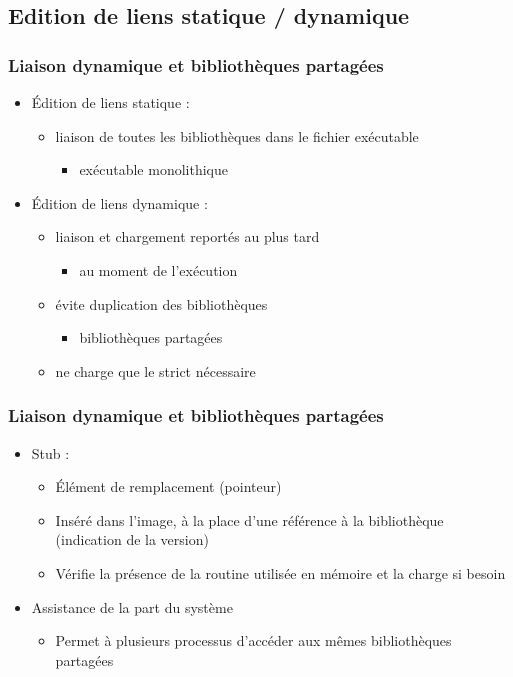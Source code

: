\subsection{Edition de liens statique / dynamique}

\begin{frame}
\frametitle{Liaison dynamique et bibliothèques partagées}
\begin{itemize}
\item Édition de liens statique : 
\begin{itemize}
\item liaison de toutes les bibliothèques dans le fichier exécutable 
\begin{itemize}
\item exécutable monolithique
\end{itemize}

\end{itemize}
\item <2->Édition de liens dynamique :
\begin{itemize}
\item liaison et chargement reportés au plus tard
\begin{itemize}
\item au moment de l'exécution
\end{itemize}
\item évite duplication des bibliothèques
\begin{itemize}
\item bibliothèques partagées
\end{itemize}
\item ne charge que le strict nécessaire
\end{itemize}
\end{itemize}
\end{frame}


\begin{frame}
\frametitle{Liaison dynamique et bibliothèques partagées}
\begin{itemize}
\item Stub :
\begin{itemize}
\item Élément de remplacement (pointeur)
\item Inséré dans l'image, à la place d'une référence à la bibliothèque (indication de la version)
\item Vérifie la présence de la routine utilisée en mémoire et la charge si besoin
\end{itemize}
\item Assistance de la part du système
\begin{itemize}
\item Permet à plusieurs processus d'accéder aux mêmes bibliothèques partagées
\end{itemize}
\end{itemize}
\end{frame}


